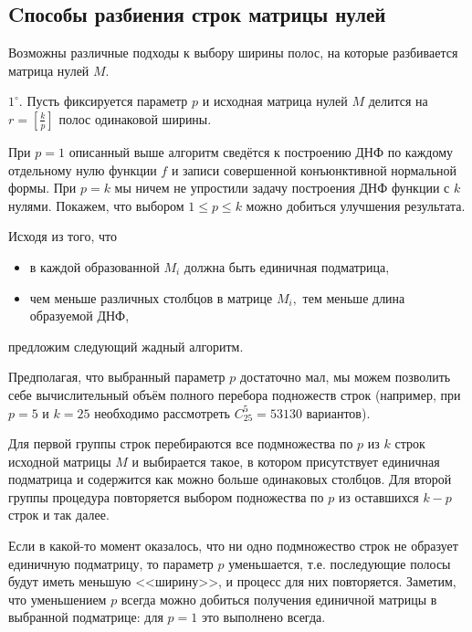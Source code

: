 \documentclass[12pt,a4paper,oneside,fleqn,leqno]{article}
\theoremstyle{definition}
\begin{document}
		\subsection{Cпособы разбиения строк матрицы нулей}
			Возможны различные подходы к выбору ширины полос, на которые разбивается матрица нулей $M.$\par
			$1^{\circ}.$ Пусть фиксируется параметр $p$ и исходная матрица нулей $M$ делится на $r = \left[\frac{k}{p}\right]$ полос одинаковой ширины.\par
			При $p = 1$ описанный выше алгоритм сведётся к построению ДНФ по каждому отдельному нулю функции $f$ и записи совершенной конъюнктивной нормальной формы. При $p = k$ мы ничем не упростили задачу построения ДНФ функции с $k$ нулями. Покажем, что выбором $1 \leqslant p \leqslant k$ можно добиться улучшения результата.\par
			Исходя из того, что
			\begin{itemize}\itemsep=0pt
				\item
				в каждой образованной $M_i$ должна быть единичная подматрица,
				\item
					чем меньше различных столбцов в матрице $M_i,$ тем меньше длина образуемой ДНФ,
			\end{itemize}
			предложим следующий жадный алгоритм.\par
			Предполагая, что выбранный параметр $p$ достаточно мал, мы можем позволить себе вычислительный объём полного перебора подножеств строк (например, при $p = 5$ и $k = 25$ необходимо рассмотреть $C_{25}^5 = 53130$ вариантов).\par
			Для первой группы строк перебираются все подмножества по $p$ из $k$ строк исходной матрицы $M$ и выбирается такое, в котором присутствует единичная подматрица и содержится как можно больше одинаковых столбцов. Для второй группы процедура повторяется выбором подножества по $p$ из оставшихся $k - p$ строк и так далее.\par
			Если в какой-то момент оказалось, что ни одно подмножество строк не образует единичную подматрицу, то параметр $p$ уменьшается, т.е. последующие полосы будут иметь меньшую <<ширину>>, и процесс для них повторяется. Заметим, что уменьшением $p$ всегда можно добиться получения единичной матрицы в выбранной подматрице: для $p = 1$ это выполнено всегда.\par %
\end{document}
